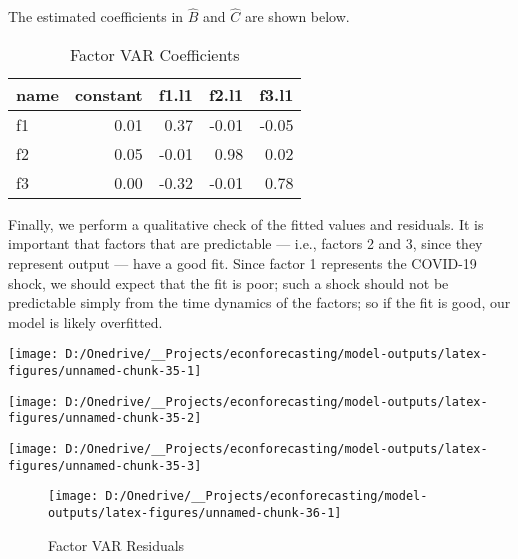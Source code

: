 \documentclass[11pt, letterpaper]{article}\usepackage[]{graphicx}\usepackage[]{color}
\begin{document}
The estimated coefficients in $\widehat{B}$ and $\widehat{C}$ are shown below.
\begin{table}[H]
\centering
\begingroup\footnotesize
\begin{tabular}{lrrrr}
  \hline
name & constant & f1.l1 & f2.l1 & f3.l1 \\ 
  \hline
f1 & 0.01 & 0.37 & -0.01 & -0.05 \\ 
  f2 & 0.05 & -0.01 & 0.98 & 0.02 \\ 
  f3 & 0.00 & -0.32 & -0.01 & 0.78 \\ 
   \hline
\end{tabular}
\endgroup
\caption{Factor VAR Coefficients} 
\end{table}



Finally, we perform a qualitative check of the fitted values and residuals. It is important that factors that are predictable --- i.e., factors 2 and 3, since they represent output --- have a good fit. Since factor 1 represents the COVID-19 shock, we should expect that the fit is poor; such a shock should not be predictable simply from the time dynamics of the factors; so if the fit is good, our model is likely overfitted.


{\centering \texttt{[image: D:/Onedrive/\_\_Projects/econforecasting/model-outputs/latex-figures/unnamed-chunk-35-1]} 

}




{\centering \texttt{[image: D:/Onedrive/\_\_Projects/econforecasting/model-outputs/latex-figures/unnamed-chunk-35-2]} 

}




{\centering \texttt{[image: D:/Onedrive/\_\_Projects/econforecasting/model-outputs/latex-figures/unnamed-chunk-35-3]} 

}





\begin{figure}[H]

{\centering \texttt{[image: D:/Onedrive/\_\_Projects/econforecasting/model-outputs/latex-figures/unnamed-chunk-36-1]} 

}

\caption[Factor VAR Residuals]{Factor VAR Residuals}\label{fig:unnamed-chunk-36}
\end{figure}
\end{document}
